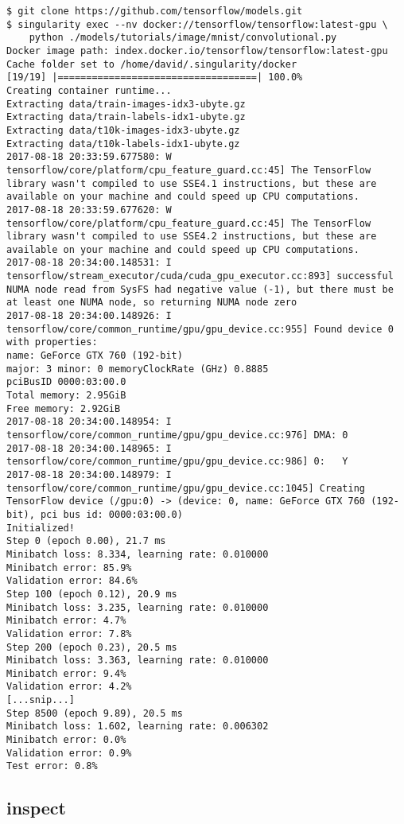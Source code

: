 \documentclass[a4paper]{article}
\begin{document}
\begin{lstlisting}[frame=single]
$ git clone https://github.com/tensorflow/models.git
$ singularity exec --nv docker://tensorflow/tensorflow:latest-gpu \
    python ./models/tutorials/image/mnist/convolutional.py
Docker image path: index.docker.io/tensorflow/tensorflow:latest-gpu
Cache folder set to /home/david/.singularity/docker
[19/19] |===================================| 100.0%
Creating container runtime...
Extracting data/train-images-idx3-ubyte.gz
Extracting data/train-labels-idx1-ubyte.gz
Extracting data/t10k-images-idx3-ubyte.gz
Extracting data/t10k-labels-idx1-ubyte.gz
2017-08-18 20:33:59.677580: W tensorflow/core/platform/cpu_feature_guard.cc:45] The TensorFlow library wasn't compiled to use SSE4.1 instructions, but these are available on your machine and could speed up CPU computations.
2017-08-18 20:33:59.677620: W tensorflow/core/platform/cpu_feature_guard.cc:45] The TensorFlow library wasn't compiled to use SSE4.2 instructions, but these are available on your machine and could speed up CPU computations.
2017-08-18 20:34:00.148531: I tensorflow/stream_executor/cuda/cuda_gpu_executor.cc:893] successful NUMA node read from SysFS had negative value (-1), but there must be at least one NUMA node, so returning NUMA node zero
2017-08-18 20:34:00.148926: I tensorflow/core/common_runtime/gpu/gpu_device.cc:955] Found device 0 with properties:
name: GeForce GTX 760 (192-bit)
major: 3 minor: 0 memoryClockRate (GHz) 0.8885
pciBusID 0000:03:00.0
Total memory: 2.95GiB
Free memory: 2.92GiB
2017-08-18 20:34:00.148954: I tensorflow/core/common_runtime/gpu/gpu_device.cc:976] DMA: 0
2017-08-18 20:34:00.148965: I tensorflow/core/common_runtime/gpu/gpu_device.cc:986] 0:   Y
2017-08-18 20:34:00.148979: I tensorflow/core/common_runtime/gpu/gpu_device.cc:1045] Creating TensorFlow device (/gpu:0) -> (device: 0, name: GeForce GTX 760 (192-bit), pci bus id: 0000:03:00.0)
Initialized!
Step 0 (epoch 0.00), 21.7 ms
Minibatch loss: 8.334, learning rate: 0.010000
Minibatch error: 85.9%
Validation error: 84.6%
Step 100 (epoch 0.12), 20.9 ms
Minibatch loss: 3.235, learning rate: 0.010000
Minibatch error: 4.7%
Validation error: 7.8%
Step 200 (epoch 0.23), 20.5 ms
Minibatch loss: 3.363, learning rate: 0.010000
Minibatch error: 9.4%
Validation error: 4.2%
[...snip...]
Step 8500 (epoch 9.89), 20.5 ms
Minibatch loss: 1.602, learning rate: 0.006302
Minibatch error: 0.0%
Validation error: 0.9%
Test error: 0.8%
\end{lstlisting}


\subsection{inspect}
\label{sec:inspect}
\end{document}
